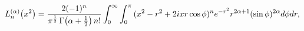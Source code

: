\[\mathop{L^{(\alpha)}_{n}\/}\nolimits\!\left(x^{2}\right)=\frac{2(-1)^{n}}{\pi^%
{\frac{1}{2}}\mathop{\Gamma\/}\nolimits\!\left(\alpha+\tfrac{1}{2}\right)n!}\*%
\int_{0}^{\infty}\int_{0}^{\pi}{(x^{2}-r^{2}+2ixr\mathop{\cos\/}\nolimits\phi)%
^{n}}\*e^{-r^{2}}r^{2\alpha+1}(\mathop{\sin\/}\nolimits\phi)^{2\alpha}d\phi dr,\]